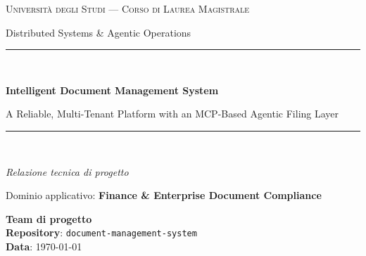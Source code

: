 \documentclass[11pt,a4paper,oneside]{article}
\begin{document}
\begin{titlepage}
    \centering
    \vspace*{1.5cm}
    {\scshape\Large Universit\`a degli Studi --- Corso di Laurea Magistrale\par}
    \vspace{0.4cm}
    {\large Distributed Systems \& Agentic Operations\par}
    \vspace{2.0cm}
    \rule{\linewidth}{0.4pt}\\[0.6cm]
    {\huge\bfseries Intelligent Document Management System\par}
    \vspace{0.3cm}
    {\Large A Reliable, Multi-Tenant Platform with an MCP-Based Agentic Filing Layer\par}
    \rule{\linewidth}{0.4pt}\\[1.2cm]

    {\large\itshape Relazione tecnica di progetto\par}
    \vspace{0.4cm}
    {\large Dominio applicativo: \textbf{Finance \& Enterprise Document Compliance}\par}
    \vfill
    \begin{flushleft}
        \textbf{Team di progetto}\\
        \textbf{Repository}: \texttt{document-management-system}\\
        \textbf{Data}: \today
    \end{flushleft}
\end{titlepage}

\begin{abstract}
\noindent
Il presente lavoro descrive la progettazione, l'implementazione e la valutazione
di un \emph{Document Management System} (DMS) distribuito e multi-tenant, esteso
con uno strato di \emph{Agentic Operations} basato sul \emph{Model Context Protocol}
(MCP). Il sistema risolve un problema operativo concreto del dominio
\emph{Finance \& Enterprise Document Compliance}: l'acquisizione automatica,
la classificazione e l'archiviazione di documenti amministrativi (fatture,
contratti, ordini, comunicazioni di compliance) ricevuti via posta elettronica.
La trattazione adotta la struttura prevista dalle linee guida del corso, articolando
le motivazioni di dominio, l'architettura distribuita, i meccanismi di affidabilit\`a
e scalabilit\`a, l'osservabilit\`a, i ruoli dell'agente, il design degli MCP server,
la politica di sicurezza operativa, gli esperimenti di guasto, l'analisi
SLO--costi--\emph{ROI} e le politiche DevSecOps. Particolare attenzione \`e
riservata alla separazione fra automazione deterministica, decisione agentica
e \emph{human-in-the-loop}, alla gestione delle azioni ad alto impatto e
alla riduzione del rischio di allucinazione tramite \emph{structured outputs}
e soglie di confidenza.
\end{abstract}
\end{document}
